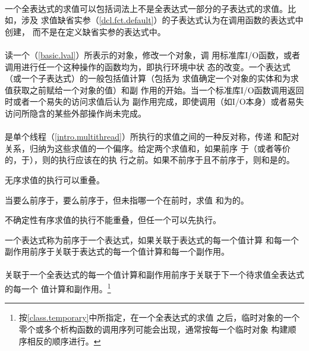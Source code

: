 \paragraph{} %
\begin{note}
  一个全表达式的求值可以包括词法上不是全表达式一部分的子表达式的求值。比如，涉及
  求值缺省实参（\ref{dcl.fct.default}）的子表达式认为在调用函数的表达式中创建，
  而不是在定义缺省实参的表达式中。
\end{note}

\paragraph{} %
读一个\glvalue{}（\ref{basic.lval}）所表示的对象，修改一个对象，调
用标准库I/O函数，或者调用进行任一个这种操作的函数均为，即执行环境中状
态的改变。一个表达式（或一个子表达式）的一般包括值计算（包括为
\glvalue{}求值确定一个对象的实体和为\prvalue{}求值获取之前赋给一个对象的值）和副
作用的开始。当一个标准库I/O函数调用返回时或者一个易失\glvalue{}的访问求值后认为
副作用完成，即使调用（如I/O本身）或者易失访问所隐含的某些外部操作尚未完成。

\paragraph{} %
是单个线程（\ref{intro.multithread}）所执行的求值之间的一种反对称，传递
和配对关系，归纳为这些求值的一个偏序。给定两个求值和，如果前序
于（或者等价的，于），则的执行应该在的执
行之前。如果不前序于且不前序于，则和是的。

\begin{note}
  无序求值的执行可以重叠。
\end{note}

当要么前序于，要么前序于，但未指哪一个在前时，求值
和为的。

\begin{note}
  不确定性有序求值的执行不能重叠，但任一个可以先执行。
\end{note}

一个表达式称为前序于一个表达式，如果关联于表达式的每一个值计算
和每一个副作用前序于关联于表达式的每一个值计算和每一个副作用。

\paragraph{} %
关联于一个全表达式的每一个值计算和副作用前序于关联于下一个待求值全表达式的每一个
值计算和副作用。\footnote{按\ref{class.temporary}中所指定，在一个全表达式的求值
之后，临时对象的一个零个或多个析构函数的调用序列可能会出现，通常按每一个临时对象
构建顺序相反的顺序进行。}

